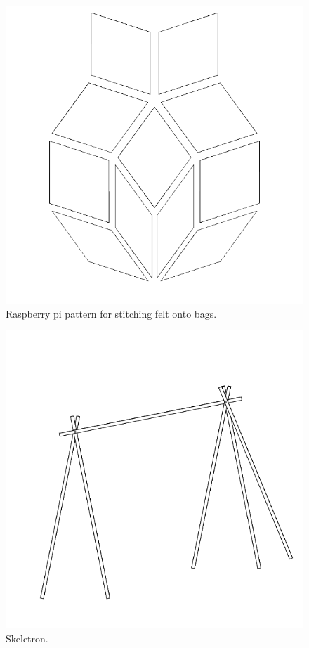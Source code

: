 \documentclass{report}
\begin{document}
\begin{figure}
	\centering
	\includegraphics[width=5in]{imageserver/uploadimages/image8.png}
	\caption{Raspberry pi pattern for stitching felt onto bags.}
\end{figure}

\begin{figure}
	\centering
	\includegraphics[width=5in]{imageserver/uploadimages/image9.png}
	\caption{Skeletron.}
\end{figure}
\end{document}
